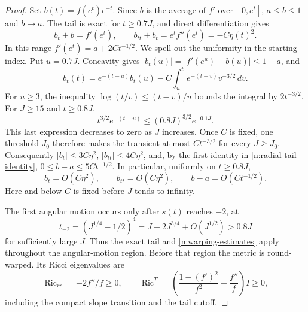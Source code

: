 \begin{proof}
Set $b(t)=f(e^t)e^{-t}$.  Since $b$ is the average of $f'$ over $[0,e^t]$,
$a\le b\le1$ and $b\to a$.  The tail is exact for $t\ge0.7J$, and
direct differentiation gives
\begin{equation}
 b_t+b=f'(e^t),\qquad
 b_{tt}+b_t=e^tf''(e^t)=-C\eta(t)^2.
 \label{n:radial-tail-identity}
\end{equation}
In this range $f'(e^t)=a+2Ct^{-1/2}$.  We spell out the uniformity in the starting index. Put $u=0.7J$.
Concavity gives $|b_t(u)|=|f'(e^u)-b(u)|\le1-a$, and
\[
 b_t(t)=e^{-(t-u)}b_t(u)
       -C\int_u^t e^{-(t-v)}v^{-3/2}\,dv.
\]
For $u\ge3$, the inequality $\log(t/v)\le(t-v)/u$ bounds the
integral by $2t^{-3/2}$. For $J\ge15$ and $t\ge0.8J$,
\[
 t^{3/2}e^{-(t-u)}\le(0.8J)^{3/2}e^{-0.1J}.
\]
This last expression decreases to zero as $J$ increases. Once $C$ is
fixed, one threshold $J_0$ therefore makes the transient at most
$Ct^{-3/2}$ for every $J\ge J_0$. Consequently
$|b_t|\le3C\eta^2$, $|b_{tt}|\le4C\eta^2$, and, by the first
identity in \eqref{n:radial-tail-identity},
$0\le b-a\le5Ct^{-1/2}$. In particular, uniformly on $t\ge0.8J$,
\begin{equation}
 b_t=O(C\eta^2),\qquad b_{tt}=O(C\eta^2),\qquad
 b-a=O(Ct^{-1/2}).
 \label{n:warping-estimates}
\end{equation}
Here and below $C$ is fixed before $J$ tends to infinity.

The first angular motion occurs only after $s(t)$ reaches $-2$, at
\[
 t_{-2}=(J^{1/4}-1/2)^4
       =J-2J^{3/4}+O(J^{1/2})>0.8J
\]
for sufficiently large $J$.  Thus the exact tail and
\eqref{n:warping-estimates} apply throughout the angular-motion region.
Before that region the metric is round-warped.  Its Ricci eigenvalues are
\[
 \operatorname{Ric}_{rr}=-2f''/f\ge0,
 \qquad
 \operatorname{Ric}^{T}
 =\left(\frac{1-(f')^2}{f^2}-\frac{f''}{f}\right)I\ge0,
\]
including the compact slope transition and the tail cutoff.


\end{proof}
